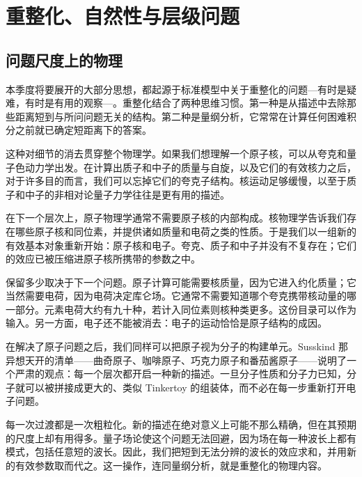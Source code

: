 \chapter{重整化、自然性与层级问题}


\section{问题尺度上的物理}

本季度将要展开的大部分思想，都起源于标准模型中关于重整化的问题---有时是疑难，有时是有用的观察---。重整化结合了两种思维习惯。第一种是从描述中去除那些距离短到与所问问题无关的结构。第二种是量纲分析，它常常在计算任何困难积分之前就已确定短距离下的答案。

这种对细节的消去贯穿整个物理学。如果我们想理解一个原子核，可以从夸克和量子色动力学出发。在计算出质子和中子的质量与自旋，以及它们的有效核力之后，对于许多目的而言，我们可以忘掉它们的夸克子结构。核运动足够缓慢，以至于质子和中子的非相对论量子力学往往是更有用的描述。

在下一个层次上，原子物理学通常不需要原子核的内部构成。核物理学告诉我们存在哪些原子核和同位素，并提供诸如质量和电荷之类的性质。于是我们以一组新的有效基本对象重新开始：原子核和电子。夸克、质子和中子并没有不复存在；它们的效应已被压缩进原子核所携带的参数之中。

保留多少取决于下一个问题。原子计算可能需要核质量，因为它进入约化质量；它当然需要电荷，因为电荷决定库仑场。它通常不需要知道哪个夸克携带核动量的哪一部分。元素电荷大约有九十种，若计入同位素则核种类更多。这份目录可以作为输入。另一方面，电子还不能被消去：电子的运动恰恰是原子结构的成因。

在解决了原子问题之后，我们同样可以把原子视为分子的构建单元。Susskind 那异想天开的清单——曲奇原子、咖啡原子、巧克力原子和番茄酱原子——说明了一个严肃的观点：每一个层次都开启一种新的描述。一旦分子性质和分子力已知，分子就可以被拼接成更大的、类似 Tinkertoy 的组装体，而不必在每一步重新打开电子问题。

每一次过渡都是一次粗粒化。新的描述在绝对意义上可能不那么精确，但在其预期的尺度上却有用得多。量子场论使这个问题无法回避，因为场在每一种波长上都有模式，包括任意短的波长。因此，我们把短到无法分辨的波长的效应求和，并用新的有效参数取而代之。这一操作，连同量纲分析，就是重整化的物理内容。

